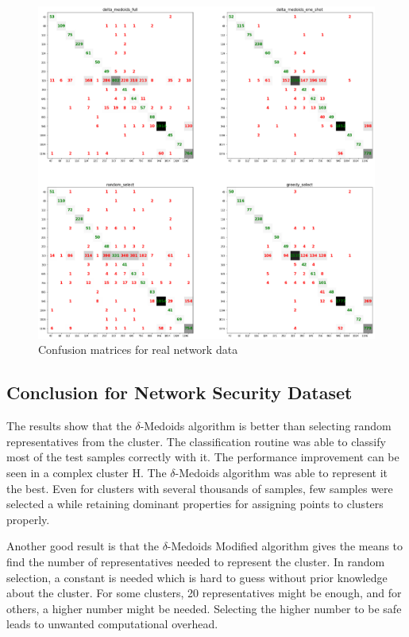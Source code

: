 \documentclass[thesis=B,english]{FITthesis}[2012/10/20]
\begin{document}
\begin{figure}[t]
   \includegraphics[width=\linewidth]{img/exp4.png}
  \caption{Confusion matrices for real network data}
  \label{img:exp4}
\end{figure}


\subsection{Conclusion for Network Security Dataset}
The results show that the $\delta$-Medoids algorithm is better than selecting random representatives from the cluster.
The classification routine was able to classify most of the test samples correctly with it.
The performance improvement can be seen in a complex cluster H.
The $\delta$-Medoids algorithm was able to represent it the best.
Even for clusters with several thousands of samples, few samples were selected a while retaining dominant properties for assigning points to clusters properly.

Another good result is that the $\delta$-Medoids Modified algorithm gives the means to find the number of representatives needed to represent the cluster.
In random selection, a constant is needed which is hard to guess without prior knowledge about the cluster.
For some clusters, 20 representatives might be enough, and for others, a higher number might be needed.
Selecting the higher number to be safe leads to unwanted computational overhead.
\end{document}
